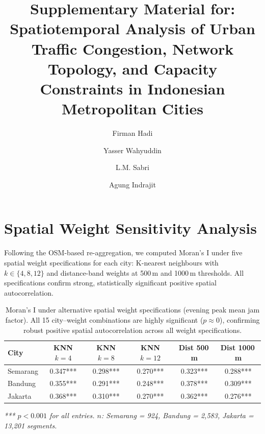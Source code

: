 \documentclass[preprint,12pt]{elsarticle}
\begin{document}
\begin{frontmatter}

\title{Supplementary Material for:\\
Spatiotemporal Analysis of Urban Traffic Congestion, Network Topology, and Capacity Constraints in Indonesian Metropolitan Cities}

\author[undip]{Firman Hadi}
\author[undip]{Yasser Wahyuddin}
\author[undip]{L.M. Sabri}
\author[nca]{Agung Indrajit}



\end{frontmatter}

\setcounter{section}{0}
\renewcommand{\thesection}{S\arabic{section}}
\renewcommand{\thetable}{S\arabic{table}}
\renewcommand{\thefigure}{S\arabic{figure}}

\section{Spatial Weight Sensitivity Analysis}
\label{sec:s1}

Following the OSM-based re-aggregation, we computed Moran's I under five spatial weight specifications for each city: K-nearest neighbours with $k \in \{4, 8, 12\}$ and distance-band weights at 500\,m and 1000\,m thresholds. All specifications confirm strong, statistically significant positive spatial autocorrelation.

\begin{table}[!htbp]
\centering
\caption{Moran's I under alternative spatial weight specifications (evening peak mean jam factor). All 15 city--weight combinations are highly significant ($p \approx 0$), confirming robust positive spatial autocorrelation across all weight specifications.}
\label{tab:s1}
\begin{tabular}{lccccc}
\toprule
City & KNN $k{=}4$ & KNN $k{=}8$ & KNN $k{=}12$ & Dist 500\,m & Dist 1000\,m \\
\midrule
Semarang & 0.347*** & 0.298*** & 0.270*** & 0.323*** & 0.288*** \\
Bandung  & 0.355*** & 0.291*** & 0.248*** & 0.378*** & 0.309*** \\
Jakarta  & 0.368*** & 0.310*** & 0.270*** & 0.362*** & 0.276*** \\
\bottomrule
\end{tabular}

\smallskip
\noindent\textit{*** $p < 0.001$ for all entries. $n$: Semarang = 924, Bandung = 2,583, Jakarta = 13,201 segments.}
\end{table}
\end{document}
